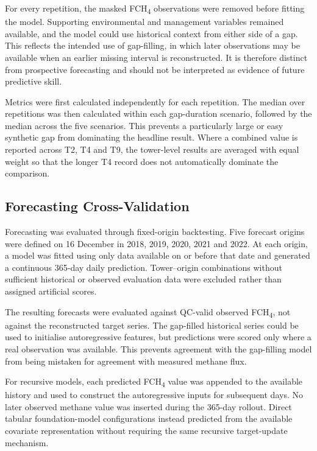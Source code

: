 For every repetition, the masked FCH\textsubscript{4} observations were removed
before fitting the model. Supporting environmental and management variables
remained available, and the model could use historical context from either
side of a gap. This reflects the intended use of gap-filling, in which later
observations may be available when an earlier missing interval is
reconstructed. It is therefore distinct from prospective forecasting and
should not be interpreted as evidence of future predictive skill.

Metrics were first calculated independently for each repetition. The median
over repetitions was then calculated within each gap-duration scenario,
followed by the median across the five scenarios. This prevents a particularly
large or easy synthetic gap from dominating the headline result. Where a
combined value is reported across T2, T4 and T9, the tower-level results are
averaged with equal weight so that the longer T4 record does not automatically dominate
the comparison.


\subsection{Forecasting Cross-Validation}

Forecasting was evaluated through fixed-origin backtesting. Five forecast
origins were defined on 16 December in 2018, 2019, 2020, 2021 and 2022.
At each origin, a model was fitted using only data available on or before that
date and generated a continuous 365-day daily prediction. Tower--origin
combinations without sufficient historical or observed evaluation data were
excluded rather than assigned artificial scores.

The resulting forecasts were evaluated against QC-valid observed
FCH\textsubscript{4}, not against the reconstructed target series. The
gap-filled historical series could be used to initialise autoregressive
features, but predictions were scored only where a real observation was
available. This prevents agreement with the gap-filling model from being
mistaken for agreement with measured methane flux.

For recursive models, each predicted FCH\textsubscript{4} value was appended
to the available history and used to construct the autoregressive inputs for
subsequent days. No later observed methane value was inserted during the
365-day rollout. Direct tabular foundation-model configurations instead
predicted from the available covariate representation without requiring the
same recursive target-update mechanism.

